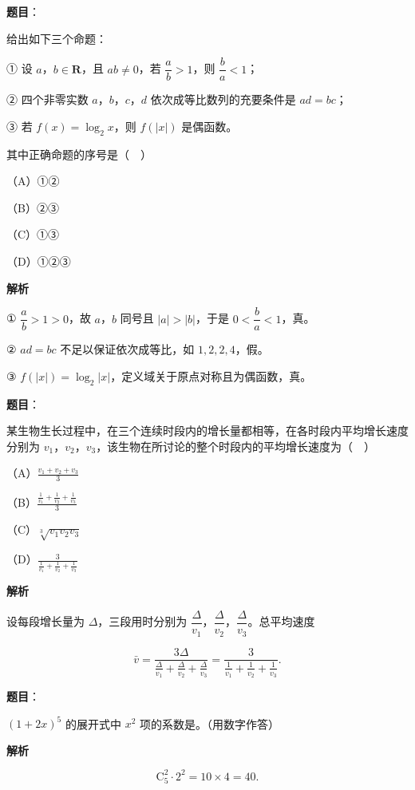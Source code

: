 \begin{answer}

\textbf{题目}：

给出如下三个命题：

① 设 $a$，$b\in\mathbf R$，且 $ab\neq0$，若 $\dfrac ab>1$，则 $\dfrac ba<1$；

② 四个非零实数 $a$，$b$，$c$，$d$ 依次成等比数列的充要条件是 $ad=bc$；

③ 若 $f(x)=\log_2x$，则 $f(|x|)$ 是偶函数。

其中正确命题的序号是（　）

（A）①②

（B）②③

（C）①③

（D）①②③

\textbf{解析}

① $\dfrac ab>1>0$，故 $a$，$b$ 同号且 $|a|>|b|$，于是 $0<\dfrac ba<1$，真。

② $ad=bc$ 不足以保证依次成等比，如 $1,2,2,4$，假。

③ $f(|x|)=\log_2|x|$，定义域关于原点对称且为偶函数，真。


\end{answer}
\begin{answer}

\textbf{题目}：

某生物生长过程中，在三个连续时段内的增长量都相等，在各时段内平均增长速度分别为 $v_1$，$v_2$，$v_3$，该生物在所讨论的整个时段内的平均增长速度为（　）

（A）$\frac{v_1+v_2+v_3}{3}$

（B）$\frac{\frac1{v_1}+\frac1{v_2}+\frac1{v_3}}{3}$

（C）$\sqrt[3]{v_1v_2v_3}$

（D）$\frac3{\frac1{v_1}+\frac1{v_2}+\frac1{v_3}}$

\textbf{解析}

设每段增长量为 $\Delta$，三段用时分别为 $\dfrac{\Delta}{v_1}$，$\dfrac{\Delta}{v_2}$，$\dfrac{\Delta}{v_3}$。总平均速度

\nopagebreak[4]
\[\bar v=\frac{3\Delta}{\frac{\Delta}{v_1}+\frac{\Delta}{v_2}+\frac{\Delta}{v_3}}
=\frac3{\frac1{v_1}+\frac1{v_2}+\frac1{v_3}}.\]


\end{answer}
\begin{answer}

\textbf{题目}：

$(1+2x)^5$ 的展开式中 $x^2$ 项的系数是\gkblank{}。（用数字作答）

\textbf{解析}

\nopagebreak[4]
\[\mathrm C_5^2\cdot2^2=10\times4=40.\]


\end{answer}
